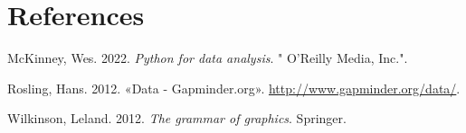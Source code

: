 \documentclass[
  portuguese,
  letterpaper,
  DIV=11,
  numbers=noendperiod]{scrreprt}
\newlength{\cslhangindent}
\newenvironment{CSLReferences}[2] %
 {\begin{list}{}{%
  \setlength{\itemindent}{0pt}
  \setlength{\leftmargin}{0pt}
  \setlength{\parsep}{0pt}
  \ifodd #1
   \setlength{\leftmargin}{\cslhangindent}
   \setlength{\itemindent}{-1\cslhangindent}
  \fi
  \setlength{\itemsep}{#2\baselineskip}}}
 {\end{list}}
\theoremstyle{definition}
\theoremstyle{remark}
\begin{document}

\chapter*{References}\label{references}


\label{refs}
\begin{CSLReferences}{1}{0}
McKinney, Wes. 2022. \emph{Python for data analysis}. " O'Reilly Media,
Inc.".

Rosling, Hans. 2012. {«Data - Gapminder.org»}.
\url{http://www.gapminder.org/data/}.

Wilkinson, Leland. 2012. \emph{The grammar of graphics}. Springer.

\end{CSLReferences}
\end{document}
